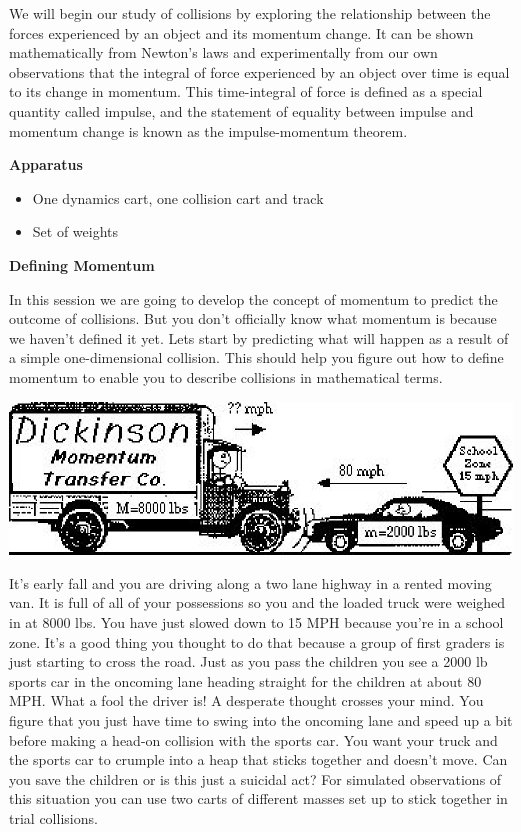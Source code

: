 We will begin our study of collisions by exploring the relationship between
the forces experienced by an object and its momentum change. It can be shown
mathematically from Newton's laws and experimentally from our own observations
that the integral of force experienced by an object over time is equal to its
change in momentum. This time-integral of force is defined as a special quantity
called impulse, and the statement of equality between impulse and momentum change
is known as the impulse-momentum theorem.

\textbf{Apparatus} 

\begin{itemize}
\item One dynamics cart, one collision cart and track
\item Set of weights
\end{itemize}
\textbf{Defining Momentum }

In this session we are going to develop the concept of momentum to predict the
outcome of collisions. But you don't officially know what momentum is because
we haven't defined it yet. Lets start by predicting what will happen as a result
of a simple one-dimensional collision. This should help you figure out how to
define momentum to enable you to describe collisions in mathematical terms.

\vspace{0.3cm}
{\par\centering \includegraphics{momentum/momentum_fig1.eps} \par}
\vspace{0.3cm}

It's early fall and you are driving along a two lane highway in a rented moving
van. It is full of all of your possessions so you and the loaded truck were
weighed in at 8000 lbs. You have just slowed down to 15 MPH because you're in
a school zone. It's a good thing you thought to do that because a group of first
graders is just starting to cross the road. Just as you pass the children you
see a 2000 lb sports car in the oncoming lane heading straight for the children
at about 80 MPH. What a fool the driver is! A desperate thought crosses your
mind. You figure that you just have time to swing into the oncoming lane and
speed up a bit before making a head-on collision with the sports car. You want
your truck and the sports car to crumple into a heap that sticks together and
doesn't move. Can you save the children or is this just a suicidal act? For
simulated observations of this situation you can use two carts of different
masses set up to stick together in trial collisions. 

